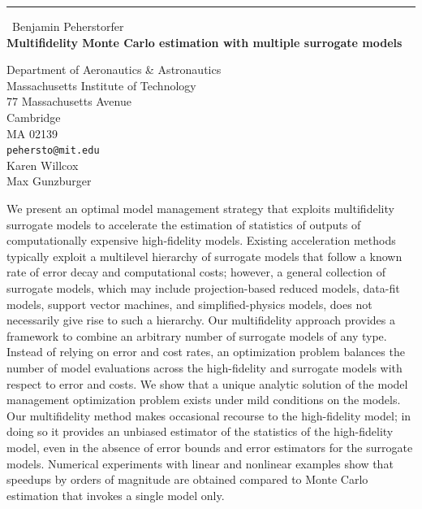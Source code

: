 \documentclass{report}
\begin{document}
\begin{center}
\rule{6in}{1pt} \
{\large Benjamin Peherstorfer \\
{\bf Multifidelity Monte Carlo estimation with multiple surrogate models}}

Department of Aeronautics \& Astronautics \\ Massachusetts Institute of Technology \\ 77 Massachusetts Avenue \\ Cambridge \\ MA 02139
\\
{\tt pehersto@mit.edu}\\
Karen Willcox\\
Max Gunzburger\end{center}

We present an optimal model management strategy that exploits
multifidelity surrogate models to accelerate the estimation of statistics
of outputs of computationally expensive high-fidelity models. Existing
acceleration methods typically exploit a multilevel hierarchy of
surrogate models that follow a known rate of error decay and
computational costs; however, a general collection of surrogate models,
which may include projection-based reduced models, data-fit models,
support vector machines, and simplified-physics models, does not
necessarily give rise to such a hierarchy. Our multifidelity approach
provides a framework to combine an arbitrary number of surrogate models
of any type. Instead of relying on error and cost rates, an optimization
problem balances the number of model evaluations across the high-fidelity
and surrogate models with respect to error and costs. We show that a
unique analytic solution of the model management optimization problem
exists under mild conditions on the models. Our multifidelity method
makes occasional recourse to the high-fidelity model; in doing so it
provides an unbiased estimator of the statistics of the high-fidelity
model, even in the absence of error bounds and error estimators for the
surrogate models. Numerical experiments with linear and nonlinear
examples show that speedups by orders of magnitude are obtained compared
to Monte Carlo estimation that invokes a single model only.
\end{document}
